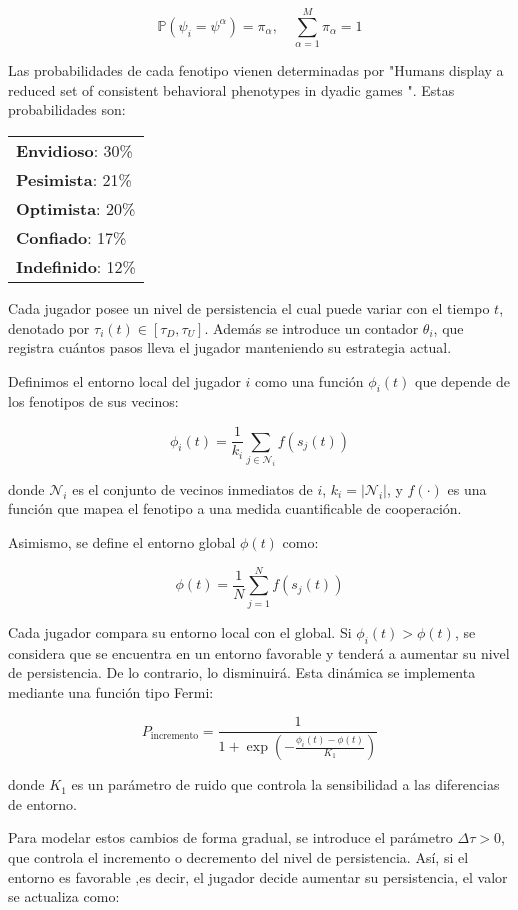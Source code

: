 \documentclass[a4paper,12pt]{report}
\begin{document}
\[
\mathbb{P}(\psi_i = \psi^\alpha) = \pi_\alpha, \quad \sum_{\alpha=1}^{M} \pi_\alpha = 1
\]

Las probabilidades de cada fenotipo vienen determinadas por "Humans display a reduced set of consistent behavioral phenotypes in dyadic games "\cite{paper_principal}. Estas probabilidades son:

\begin{center}
\small
\begin{tabular}{l}
\textbf{Envidioso}: 30\% \\
\textbf{Pesimista}: 21\% \\
\textbf{Optimista}: 20\% \\
\textbf{Confiado}: 17\% \\
\textbf{Indefinido}: 12\% \\
\end{tabular}
\end{center}

Cada jugador posee un nivel de persistencia el cual puede variar con el tiempo \(t\), denotado por \( \tau_i(t) \in [\tau_D, \tau_U] \). Además se introduce un contador \( \theta_i \), que registra cuántos pasos lleva el jugador manteniendo su estrategia actual.

Definimos el entorno local del jugador \( i \) como una función \( \phi_i(t) \) que depende de los fenotipos de sus vecinos:

\[
\phi_i(t) = \frac{1}{k_i} \sum_{j \in \mathcal{N}_i} f(s_j(t))
\]

donde \( \mathcal{N}_i \) es el conjunto de vecinos inmediatos de \( i \), \( k_i = |\mathcal{N}_i| \), y \( f(\cdot) \) es una función que mapea el fenotipo a una medida cuantificable de cooperación.

Asimismo, se define el entorno global \( \phi(t) \) como:

\[
\phi(t) = \frac{1}{N} \sum_{j=1}^{N} f(s_j(t))
\]

Cada jugador compara su entorno local con el global. Si \( \phi_i(t) > \phi(t) \), se considera que se encuentra en un entorno favorable y tenderá a aumentar su nivel de persistencia. De lo contrario, lo disminuirá. Esta dinámica se implementa mediante una función tipo Fermi:

\[
P_{\text{incremento}} = \frac{1}{1 + \exp\left( -\frac{ \phi_i(t) - \phi(t) }{K_1} \right)}
\]

donde \( K_1 \) es un parámetro de ruido que controla la sensibilidad a las diferencias de entorno.

Para modelar estos cambios de forma gradual, se introduce el parámetro \( \Delta\tau > 0 \), que controla el incremento o decremento del nivel de persistencia. Así, si el entorno es favorable ,es decir, el jugador decide aumentar su persistencia, el valor se actualiza como:
\end{document}
